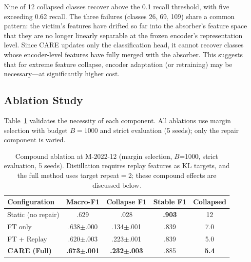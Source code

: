 \documentclass[journal]{IEEEtran}
\newcommand{\ours}{CARE}  %
\begin{document}
Nine of 12 collapsed classes recover above the 0.1 recall threshold, with five exceeding 0.62 recall. The three failures (classes 26, 69, 109) share a common pattern: the victim's features have drifted so far into the absorber's feature space that they are no longer linearly separable at the frozen encoder's representation level. Since \ours{} updates only the classification head, it cannot recover classes whose encoder-level features have fully merged with the absorber. This suggests that for extreme feature collapse, encoder adaptation (or retraining) may be necessary---at significantly higher cost.

\subsection{Ablation Study}

Table~\ref{tab:ablation} validates the necessity of each component.
All ablations use margin selection with budget $B=1000$ and strict evaluation (5 seeds); only the repair component is varied.

\begin{table}[t]
\centering
\caption{Compound ablation at M-2022-12 (margin selection, $B$=1000, strict evaluation, 5 seeds). Distillation requires replay features as KL targets, and the full method uses target repeat$=$2; these compound effects are discussed below.}
\label{tab:ablation}
\small
\begin{tabular}{@{}l cccc@{}}
\toprule
Configuration & Macro-F1 & Collapse F1 & Stable F1 & Collapsed \\
\midrule
Static (no repair)      & .629 & .028 & \textbf{.903} & 12 \\
FT only                 & .638$\pm$.000 & .134$\pm$.001 & .839 & 7.0 \\
FT + Replay             & .620$\pm$.003 & .223$\pm$.001 & .839 & 5.0 \\
\midrule
\textbf{\ours{} (Full)} & \textbf{.673$\pm$.001} & \textbf{.232$\pm$.003} & .885 & \textbf{5.4} \\
\bottomrule
\end{tabular}
\end{table}
\end{document}
